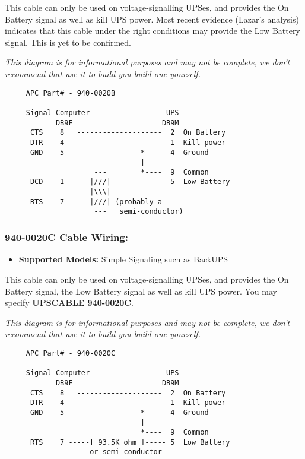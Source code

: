 This cable can only be used on voltage-signalling UPSes, and provides the On
Battery signal as well as kill UPS power. Most recent evidence (Lazar's
analysis) indicates that this cable under the right conditions may provide the
Low Battery signal. This is yet to be confirmed. 

\emph{This diagram is for informational purposes and may not be complete, we don't
recommend that use it to build you build one yourself.}
\footnotesize
\begin{verbatim}
     APC Part# - 940-0020B

     Signal Computer                  UPS
            DB9F                     DB9M
      CTS    8   --------------------  2  On Battery
      DTR    4   --------------------  1  Kill power
      GND    5   ---------------*----  4  Ground
                                |
                     ---        *----  9  Common
      DCD    1  ----|///|-----------   5  Low Battery
                    |\\\|
      RTS    7  ----|///| (probably a
                     ---   semi-conductor)
\end{verbatim}
\normalsize

\subsubsection*{940-0020C Cable Wiring:}

\begin{itemize}
\item {\bf Supported Models:} Simple Signaling such as BackUPS
\end{itemize}

This cable can only be used on voltage-signalling UPSes, and provides the 
On Battery signal, the Low Battery signal as well as kill UPS power. You may
specify {\bf UPSCABLE 940-0020C}.

\emph{This diagram is for informational purposes and may not be complete, we don't
recommend that use it to build you build one yourself.}
\footnotesize
\begin{verbatim}
     APC Part# - 940-0020C

     Signal Computer                  UPS
            DB9F                     DB9M
      CTS    8   --------------------  2  On Battery
      DTR    4   --------------------  1  Kill power
      GND    5   ---------------*----  4  Ground
                                |
                                *----  9  Common
      RTS    7 -----[ 93.5K ohm ]----- 5  Low Battery
                    or semi-conductor
\end{verbatim}
\normalsize

